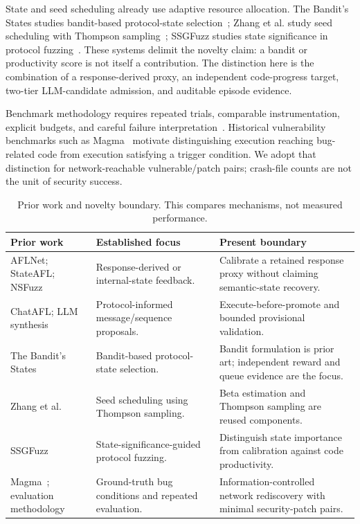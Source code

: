 \documentclass[final,5p,times,number]{elsarticle}
\begin{document}
State and seed scheduling already use adaptive resource allocation. The Bandit's States studies bandit-based protocol-state selection~\cite{bandits_states2023}; Zhang et al. study seed scheduling with Thompson sampling~\cite{zhang2026thompson}; SSGFuzz studies state significance in protocol fuzzing~\cite{ssgfuzz2026}. These systems delimit the novelty claim: a bandit or productivity score is not itself a contribution. The distinction here is the combination of a response-derived proxy, an independent code-progress target, two-tier LLM-candidate admission, and auditable episode evidence.

Benchmark methodology requires repeated trials, comparable instrumentation, explicit budgets, and careful failure interpretation~\cite{profuzzbench_benchmark_stateful_protocol_2021,sok_prudent_evaluation_practices_2024,reliability_benchmarking_2022}. Historical vulnerability benchmarks such as Magma~\cite{magma2020} motivate distinguishing execution reaching bug-related code from execution satisfying a trigger condition. We adopt that distinction for network-reachable vulnerable/patch pairs; crash-file counts are not the unit of security success.

\begin{table}[!tbp]
\centering\small
\caption{Prior work and novelty boundary. This compares mechanisms, not measured performance.}
\label{tab:novelty}
\begin{tabularx}{\textwidth}{l Y Y}
\toprule
Prior work & Established focus & Present boundary \\
\midrule
AFLNet; StateAFL; NSFuzz & Response-derived or internal-state feedback. & Calibrate a retained response proxy without claiming semantic-state recovery. \\
ChatAFL; LLM synthesis & Protocol-informed message/sequence proposals. & Execute-before-promote and bounded provisional validation. \\
The Bandit's States~\cite{bandits_states2023} & Bandit-based protocol-state selection. & Bandit formulation is prior art; independent reward and queue evidence are the focus. \\
Zhang et al.~\cite{zhang2026thompson} & Seed scheduling using Thompson sampling. & Beta estimation and Thompson sampling are reused components. \\
SSGFuzz~\cite{ssgfuzz2026} & State-significance-guided protocol fuzzing. & Distinguish state importance from calibration against code productivity. \\
Magma~\cite{magma2020}; evaluation methodology & Ground-truth bug conditions and repeated evaluation. & Information-controlled network rediscovery with minimal security-patch pairs. \\
\bottomrule
\end{tabularx}
\end{table}
\end{document}
